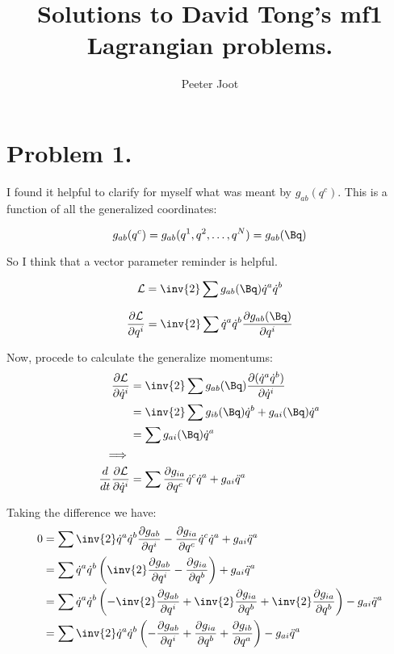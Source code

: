 \documentclass{article}
\title{ Solutions to David Tong's mf1 Lagrangian problems. } %
\author{Peeter Joot}         %
\date{}        %
\newcommand{\LL}[0]{\mathcal{L}}
\newcommand{\qdot}[0]{\dot{q}}
\newcommand{\qddot}[0]{\ddot{q}}
\newcommand{\PD}[2]{\frac{\partial {#2}}{\partial {#1}}}
\begin{document}
             

\maketitle{}

\section{ Problem 1. }

I found it helpful to clarify for myself what was meant by $g_{ab}(q^c)$.  This is a function of all the generalized coordinates:

\begin{equation*}
g_{ab}(q^c) = g_{ab}( q^1, q^2, \ldots, q^N ) = g_{ab}(\Bq)
\end{equation*}

So I think that a vector parameter reminder is helpful.

\begin{equation*}
\LL = \inv{2} \sum  g_{ab}(\Bq) \qdot^a \qdot^b
\end{equation*}

\begin{equation*}
\PD{q^i}{\LL} = \inv{2} \sum \qdot^a \qdot^b \PD{q^i}{g_{ab}(\Bq)}
\end{equation*}

Now, procede to calculate the generalize momentums:
\begin{align*}
\PD{\qdot^i}{\LL}
&= \inv{2} \sum g_{ab}(\Bq) \PD{\qdot^i}{( \qdot^a \qdot^b )} \\
&= \inv{2} \sum g_{ib}(\Bq) \qdot^b + g_{ai}(\Bq) \qdot^a \\
&= \sum g_{ai}(\Bq) \qdot^a \\
\implies \\
\frac{d}{dt} \PD{\qdot^i}{\LL} &= \sum \PD{q^c}{ g_{ia} } \qdot^c \qdot^a + g_{ai} \qddot^a \\
\end{align*}

Taking the difference we have:
\begin{align*}
0
&= \sum \inv{2} \qdot^a \qdot^b \PD{q^i}{g_{ab}} - \PD{q^c}{g_{ia}} \qdot^c \qdot^a + g_{ai} \qddot^a \\
&= \sum \qdot^a \qdot^b \left( \inv{2} \PD{q^i}{g_{ab}} - \PD{q^b}{g_{ia}} \right) + g_{ai} \qddot^a \\
&= \sum \qdot^a \qdot^b \left( -\inv{2} \PD{q^i}{g_{ab}} +\inv{2} \PD{q^b}{g_{ia}} +\inv{2} \PD{q^b}{g_{ia}} \right) - g_{ai} \qddot^a \\
&= \sum \inv{2} \qdot^a \qdot^b \left( - \PD{q^i}{g_{ab}} + \PD{q^b}{g_{ia}} + \PD{q^a}{g_{ib}} \right) - g_{ai} \qddot^a \\
\end{align*}
\end{document}
